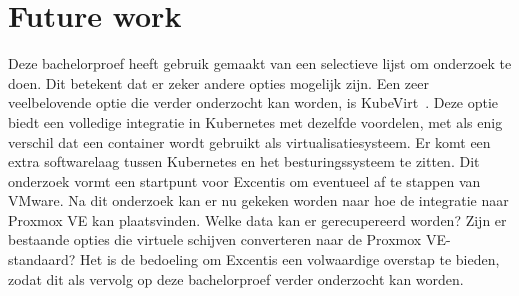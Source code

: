 \section{Future work}
Deze bachelorproef heeft gebruik gemaakt van een selectieve lijst om onderzoek te doen. Dit betekent dat er zeker andere opties mogelijk zijn. Een zeer veelbelovende optie die verder onderzocht kan worden, is KubeVirt~\autocite{kubevirt}.
Deze optie biedt een volledige integratie in Kubernetes met dezelfde voordelen, met als enig verschil dat een container wordt gebruikt als virtualisatiesysteem. Er komt een extra softwarelaag tussen Kubernetes en het besturingssysteem te zitten.
Dit onderzoek vormt een startpunt voor Excentis om eventueel af te stappen van VMware. Na dit onderzoek kan er nu gekeken worden naar hoe de integratie naar Proxmox VE kan plaatsvinden. Welke data kan er gerecupereerd worden? Zijn er bestaande opties die virtuele schijven converteren naar de Proxmox VE-standaard?
Het is de bedoeling om Excentis een volwaardige overstap te bieden, zodat dit als vervolg op deze bachelorproef verder onderzocht kan worden.